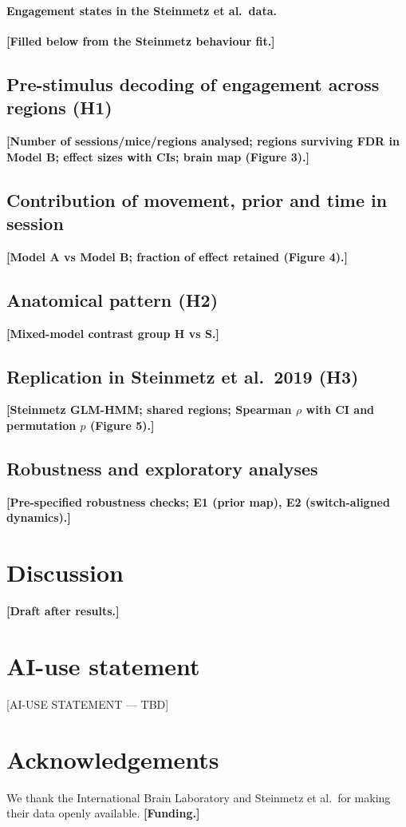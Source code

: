 \documentclass[11pt]{article}
\newcommand{\todo}[1]{\textbf{[#1]}}
\begin{document}
\paragraph{Engagement states in the Steinmetz et al.\ data.} \todo{Filled below from the Steinmetz behaviour fit.}

\subsection{Pre-stimulus decoding of engagement across regions (H1)}
\todo{Number of sessions/mice/regions analysed; regions surviving FDR in Model B; effect sizes with CIs; brain map (Figure 3).}

\subsection{Contribution of movement, prior and time in session}
\todo{Model A vs Model B; fraction of effect retained (Figure 4).}

\subsection{Anatomical pattern (H2)}
\todo{Mixed-model contrast group H vs S.}

\subsection{Replication in Steinmetz et al.\ 2019 (H3)}
\todo{Steinmetz GLM-HMM; shared regions; Spearman $\rho$ with CI and permutation $p$ (Figure 5).}

\subsection{Robustness and exploratory analyses}
\todo{Pre-specified robustness checks; E1 (prior map), E2 (switch-aligned dynamics).}

\section{Discussion}
\todo{Draft after results.}

\section*{AI-use statement}
[AI-USE STATEMENT --- TBD]

\section*{Acknowledgements}
We thank the International Brain Laboratory and Steinmetz et al.\ for making their data openly available. \todo{Funding.}



\end{document}
